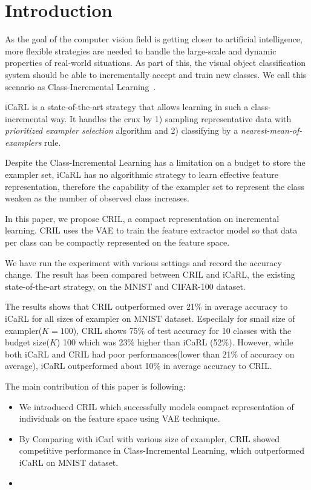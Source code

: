 \section{Introduction}
\label{sec:introduction}

As the goal of the computer vision field is getting closer to artificial intelligence, more flexible strategies are needed to handle the large-scale and dynamic properties of real-world situations. As part of this, the visual object classification system should be able to incrementally accept and train new classes. We call this scenario as Class-Incremental Learning~\cite{Rebuffi:2016aa}.

iCaRL is a state-of-the-art strategy that allows learning in such a class-incremental way. It handles the crux by 1) sampling representative data with \textit{prioritized exampler selection} algorithm and 2) classifying by a \textit{nearest-mean-of-examplers} rule.

Despite the Class-Incremental Learning has a limitation on a budget to store the exampler set, iCaRL has no algorithmic strategy to learn effective feature representation, therefore the capability of the exampler set to represent the class weaken as the number of observed class increases.

In this paper, we propose CRIL, a compact representation on incremental learning. CRIL uses the VAE to train the feature extractor model so that data per class can be compactly represented on the feature space.

We have run the experiment with various settings and record the accuracy change. The result has been compared between CRIL and iCaRL, the existing state-of-the-art strategy, on the MNIST and CIFAR-100 dataset.

The results shows that CRIL outperformed over 21\% in average accuracy to iCaRL for all sizes of exampler on MNIST dataset. Especilaly for smail size of exampler($K=100$), CRIL shows 75\% of test accuracy for 10 classes with the budget size($K$) 100 which was 23\% higher than iCaRL (52\%). However, while both iCaRL and CRIL had poor performances(lower than 21\% of accuracy on average), iCaRL outperformed about 10\% in average accuracy to CRIL.

The main contribution of this paper is following:
\begin{itemize}
\item We introduced CRIL which successfully models compact representation of individuals on the feature space using VAE technique.
\item By Comparing with iCarl with various size of exampler, CRIL showed competitive performance in Class-Incremental Learning, which outperformed iCaRL on MNIST dataset.
\item {}
\end{itemize}
